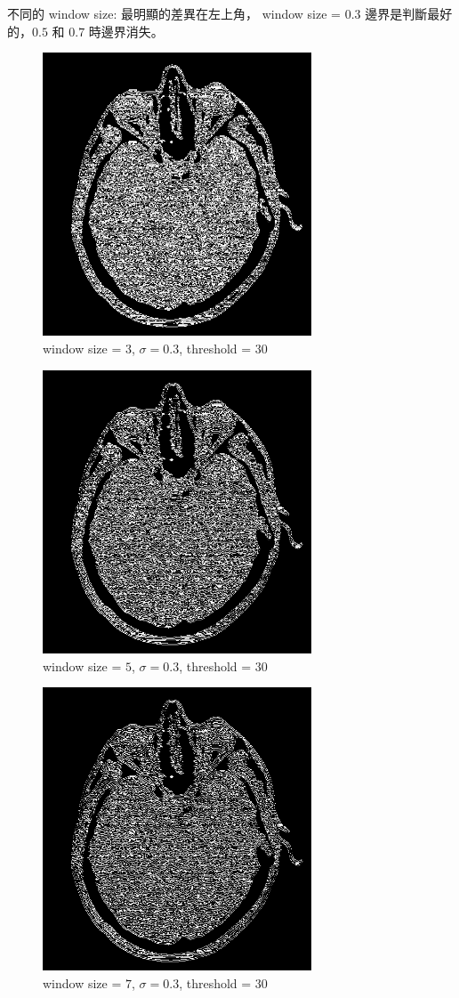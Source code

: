 \documentclass[conference]{IEEEtran}
\begin{document}
不同的 window size: 最明顯的差異在左上角， window size = $0.3$ 邊界是判斷最好的，$0.5$ 和 $0.7$ 時邊界消失。

\begin{figure}[H]
\centerline{\includegraphics[width=8cm]{headCT01.png}}
\caption{window size = $3$, $\sigma=0.3$,  threshold = $30$}
\label{headCT01}
\end{figure}

\begin{figure}[H]
\centerline{\includegraphics[width=8cm]{headCT02.png}}
\caption{window size = $5$, $\sigma=0.3$,  threshold = $30$}
\label{headCT02}
\end{figure}

\begin{figure}[H]
\centerline{\includegraphics[width=8cm]{headCT03.png}}
\caption{window size = $7$, $\sigma=0.3$,  threshold = $30$}
\label{headCT03}
\end{figure}
\end{document}
